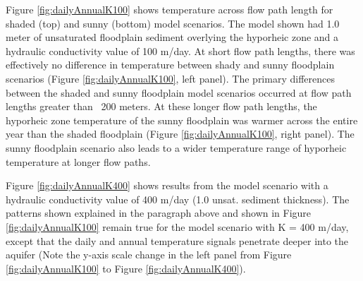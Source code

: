 \documentclass[letterpaper, 11pt]{article}
\begin{document}
Figure \ref{fig:dailyAnnualK100} shows temperature across flow path length for shaded (top) and sunny (bottom) model scenarios. The model shown had 1.0 meter of unsaturated floodplain sediment overlying the hyporheic zone and a hydraulic conductivity value of 100 m/day. At short flow path lengths, there was effectively no difference in temperature between shady and sunny floodplain scenarios (Figure \ref{fig:dailyAnnualK100}, left panel). The primary differences between the shaded and sunny floodplain model scenarios occurred at flow path lengths greater than ~200 meters. At these longer flow path lengths, the hyporheic zone temperature of the sunny floodplain was warmer across the entire year than the shaded floodplain (Figure \ref{fig:dailyAnnualK100}, right panel). The sunny floodplain scenario also leads to a wider temperature range of hyporheic temperature at longer flow paths.

Figure \ref{fig:dailyAnnualK400} shows results from the model scenario with a hydraulic conductivity value of 400 m/day (1.0 unsat. sediment thickness). The patterns shown explained in the paragraph above and shown in Figure \ref{fig:dailyAnnualK100} remain true for the model scenario with K = 400 m/day, except that the daily and annual temperature signals penetrate deeper into the aquifer (Note the y-axis scale change in the left panel from Figure \ref{fig:dailyAnnualK100} to Figure \ref{fig:dailyAnnualK400}).
\end{document}
